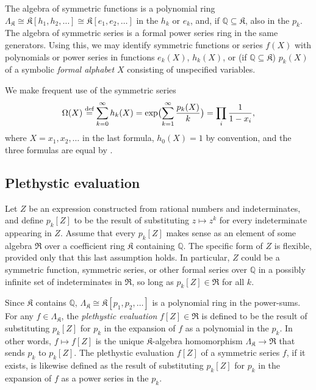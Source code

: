 \documentclass[12pt]{amsart}
\theoremstyle{definition}
\theoremstyle{remark}
\newcommand{\QQ}{{\mathbb Q}}
\newcommand{\Kfrak}{{\mathfrak K}}
\newcommand{\Rfrak}{{\mathfrak R}}
\newcommand{\defeq}{\mathrel{\overset{\text{{\rm def}}}{=}}}
\begin{document}
The algebra of symmetric functions is a polynomial ring $\Lambda
_{\Kfrak } \cong \Kfrak [h_{1}, h_{2},\ldots ] \cong \Kfrak [e_{1},
e_{2},\ldots ]$ in the $h_{k}$ or $e_{k}$, and, if $\QQ \subseteq
\Kfrak $, also in the $p_{k}$.  The algebra of symmetric series is a
formal power series ring in the same generators.  Using this, we may
identify symmetric functions or series $f(X)$ with polynomials or
power series in functions $e_{k}(X)$, $h_{k}(X)$, or (if $\QQ
\subseteq \Kfrak $) $p_{k}(X)$ of a symbolic {\em formal alphabet} $X$
consisting of unspecified variables.


We make frequent use of the symmetric series
\begin{equation}\label{e:Omega}
\Omega (X)\defeq \sum _{k=0}^{\infty } h_{k}(X) = \exp \bigl( \sum
_{k=1}^{\infty } \frac{p_{k}(X)}{k} \bigr) = \prod _{i}
\frac{1}{1-x_{i}},
\end{equation}
where $X = x_{1}, x_{2}, \ldots $ in the last formula, $h_{0}(X) = 1$
by convention, and the three formulas are equal by
\cite[(2.10)]{Macdonald95}.


\subsection{Plethystic evaluation}
\label{ss:plethysm}

Let $Z$ be an expression constructed from rational numbers and
indeterminates, and define $p_{k}[Z]$ to be the result of substituting
$z\mapsto z^{k}$ for every indeterminate appearing in $Z$.  Assume
that every $p_{k}[Z]$ makes sense as an element of some algebra
$\Rfrak $ over a coefficient ring $\Kfrak $ containing $\QQ $.  The
specific form of $Z$ is flexible, provided only that this last
assumption holds.  In particular, $Z$ could be a symmetric function,
symmetric series, or other formal series over $\QQ $ in a possibly
infinite set of indeterminates in $\Rfrak $, so long as $p_{k}[Z]\in
\Rfrak $ for all $k$.

Since $\Kfrak $ contains $\QQ $, $\Lambda _{\Kfrak } \cong \Kfrak
[p_{1}, p_{2}, \ldots ]$ is a polynomial ring in the power-sums.  For
any $f\in \Lambda _{\Kfrak }$, the {\em plethystic evaluation}
$f[Z]\in \Rfrak $ is defined to be the result of substituting
$p_{k}[Z]$ for $p_{k}$ in the expansion of $f$ as a polynomial in the
$p_{k}$.  In other words, $f\mapsto f[Z]$ is the unique $\Kfrak
$-algebra homomorphism $\Lambda _{\Kfrak }\rightarrow \Rfrak $ that
sends $p_{k}$ to $p_{k}[Z]$.  The plethystic evaluation $f[Z]$ of a
symmetric series $f$, if it exists, is likewise defined as the result
of substituting $p_{k}[Z]$ for $p_{k}$ in the expansion of $f$ as a
power series in the $p_{k}$.
\end{document}
